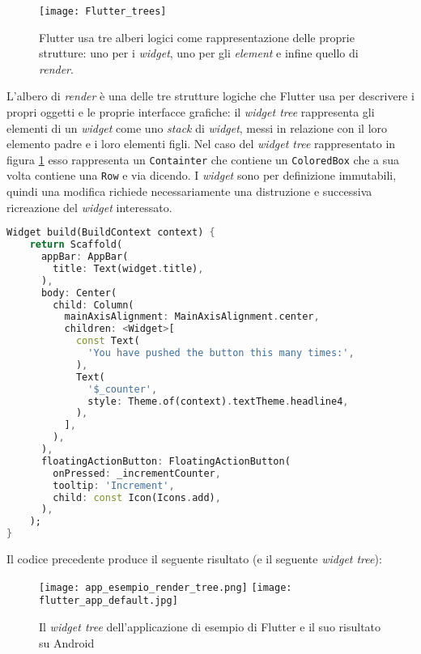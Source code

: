 \begin{figure}[H]
    \centering
    \texttt{[image: Flutter\_trees]}
    \caption[I tre alberi di Flutter]{Flutter usa tre alberi logici come rappresentazione delle proprie strutture: uno per i \textit{widget}, uno per gli \textit{element} e infine quello di \textit{render}.\footnotemark}
    \label{fig:flutter-trees}
\end{figure}

L'albero di \textit{render} è una delle tre strutture logiche che Flutter usa per descrivere i propri oggetti e le proprie interfacce grafiche: il \textit{widget tree} rappresenta gli elementi di un \textit{widget} come uno \textit{stack} di \textit{widget}, messi in relazione con il loro elemento padre e i loro elementi figli. Nel caso del \textit{widget tree} rappresentato in figura \ref{fig:flutter-trees} esso rappresenta un \verb+Containter+ che contiene un \verb+ColoredBox+ che a sua volta contiene una \verb+Row+ e via dicendo. I \textit{widget} sono per definizione immutabili, quindi una modifica richiede necessariamente una distruzione e successiva ricreazione del \textit{widget} interessato.

\begin{lstlisting}[language=dart, caption={Codice rilevante per la parte grafica dell'\textit{app} di esempio di Flutter}]
Widget build(BuildContext context) {
    return Scaffold(
      appBar: AppBar(
        title: Text(widget.title),
      ),
      body: Center(
        child: Column(
          mainAxisAlignment: MainAxisAlignment.center,
          children: <Widget>[
            const Text(
              'You have pushed the button this many times:',
            ),
            Text(
              '$_counter',
              style: Theme.of(context).textTheme.headline4,
            ),
          ],
        ),
      ),
      floatingActionButton: FloatingActionButton(
        onPressed: _incrementCounter,
        tooltip: 'Increment',
        child: const Icon(Icons.add),
      ), 
    );
}
\end{lstlisting}

Il codice precedente produce il seguente risultato (e il seguente \textit{widget tree}):

\begin{figure}[H]
    \centering
    \texttt{[image: app\_esempio\_render\_tree.png]}\hspace{15mm}
    \texttt{[image: flutter\_app\_default.jpg]}
    \caption[\textit{Widget tree} app esempio]{Il \textit{widget tree} dell'applicazione di esempio di Flutter e il suo risultato su Android}
\end{figure}

